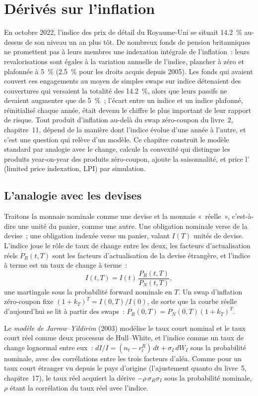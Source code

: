 \chapter{Dérivés sur l'inflation}\label{ch:rc:inflation-derivatives}

En octobre 2022, l'indice des prix de détail du Royaume-Uni se situait 14.2~\% au-dessus de son
niveau un an plus tôt. De nombreux fonds de pension britanniques ne promettent pas à leurs membres
une indexation intégrale de l'inflation~: leurs revalorisations sont égales à la variation annuelle de l'indice, plancher à zéro et
plafonnée à 5~\% (2.5~\% pour les droits acquis depuis 2005). Les fonds qui avaient couvert ces
engagements au moyen de simples swaps sur indice détenaient des couvertures qui versaient la totalité des
14.2~\%, alors que leurs passifs ne devaient augmenter que de 5~\%~; l'écart entre un indice et un indice plafonné,
réinitialisé chaque année, était devenu le chiffre le plus important de leur rapport de risque. Tout
produit d'inflation au-delà du swap zéro-coupon du livre~2, chapitre~11,
dépend de la manière dont l'indice évolue d'une année à l'autre, et c'est une question qui relève
d'un modèle. Ce chapitre construit le modèle standard par analogie avec le change,
calcule la convexité qui distingue les produits year-on-year des produits zéro-coupon,
ajoute la saisonnalité, et price l' (limited price indexation, LPI) par simulation.

\section{L'analogie avec les devises}

Traitons la monnaie nominale comme une devise et la monnaie «~réelle~», c'est-à-dire une unité du panier,
comme une autre. Une obligation nominale verse de la devise~; une obligation indexée verse un panier, valant
$I(T)$ unités de devise. L'indice joue le rôle de taux de change entre les deux, les facteurs
d'actualisation réels $P_R(t,T)$ sont les facteurs d'actualisation de la devise étrangère, et
l'indice à terme est un taux de change à terme~:
\[
I(t,T) = I(t)\,\frac{P_R(t,T)}{P_N(t,T)},
\]
une martingale sous la probabilité forward nominale en $T$. Un swap d'inflation zéro-coupon
fixe $(1+k_T)^T = I(0,T)/I(0)$, de sorte que la courbe réelle d'aujourd'hui se lit à partir des swaps~:
$P_R(0,T) = P_N(0,T)(1+k_T)^T$.

\begin{definition}\label{def:rc:inflation-derivatives:jy}
Le \emph{modèle de Jarrow--Yildirim} (2003) modélise le
taux court nominal et le taux court réel comme deux processus de Hull--White, et
l'indice comme un taux de change lognormal entre eux~:
$dI/I = (n_t-r^R_t)\,dt+\sigma_I\,dW_I$ sous la probabilité nominale, avec des corrélations
entre les trois facteurs d'aléa. Comme pour un taux court étranger vu depuis le pays d'origine
(l'ajustement quanto du livre~5, chapitre~17), le taux réel acquiert la dérive
$-\rho\,\sigma_R\sigma_I$ sous la probabilité nominale, $\rho$ étant la corrélation du
taux réel avec l'indice.
\end{definition}

